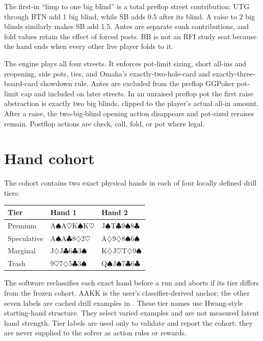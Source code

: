 \documentclass[10pt]{article}
\begin{document}
The first-in ``limp to one big blind'' is a total preflop street contribution: UTG through BTN add
1 big blind, while SB adds 0.5 after its blind. A raise to 2 big blinds similarly makes SB add 1.5.
Antes are separate sunk contributions, and fold values retain the effect of forced posts. BB is not
an RFI study seat because the hand ends when every other live player folds to it.

The engine plays all four streets. It enforces pot-limit sizing, short all-ins and reopening,
side pots, ties, and Omaha's exactly-two-hole-card and exactly-three-board-card showdown rule.
Antes are excluded from the preflop GGPoker pot-limit cap and included on later streets. In an
unraised preflop pot the first raise abstraction is exactly two big blinds, clipped to the player's
actual all-in amount. After a raise, the two-big-blind opening action disappears and pot-sized
reraises remain. Postflop actions are check, call, fold, or pot where legal.

\pagebreak[3]
\section{Hand cohort}
The cohort contains two exact physical hands in each of four locally defined drill tiers:
\begin{center}
\begin{tabular}{lll}
\toprule
Tier & Hand 1 & Hand 2 \\
\midrule
Premium & A\(\spadesuit\)A\(\heartsuit\)K\(\spadesuit\)K\(\heartsuit\) & J\(\spadesuit\)T\(\clubsuit\)9\(\spadesuit\)8\(\clubsuit\) \\
Speculative & A\(\spadesuit\)A\(\clubsuit\)8\(\diamondsuit\)2\(\heartsuit\) & A\(\diamondsuit\)9\(\diamondsuit\)8\(\spadesuit\)6\(\spadesuit\) \\
Marginal & J\(\diamondsuit\)J\(\clubsuit\)6\(\clubsuit\)3\(\spadesuit\) & K\(\diamondsuit\)J\(\heartsuit\)T\(\diamondsuit\)9\(\spadesuit\) \\
Trash & 9\(\heartsuit\)7\(\diamondsuit\)5\(\clubsuit\)3\(\spadesuit\) & Q\(\spadesuit\)J\(\spadesuit\)7\(\clubsuit\)6\(\clubsuit\) \\
\bottomrule
\end{tabular}
\end{center}
The software reclassifies each exact hand before a run and aborts if its tier differs from the
frozen cohort. AAKK is the user's classifier-derived anchor; the other seven labels are cached drill
examples in . These tier names use
Hwang-style starting-hand structure. They select varied examples and are not measured latent hand
strength. Tier labels are used only to validate and report the cohort; they are never supplied to
the solver as action rules or rewards.
\end{document}
